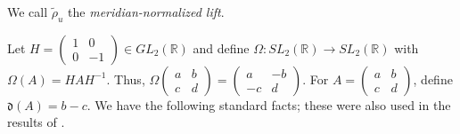\documentclass{article}
\theoremstyle{plain}
\theoremstyle{definition}
\theoremstyle{plain}
\theoremstyle{plain}
\theoremstyle{plain}
\theoremstyle{remark}
\theoremstyle{remark}
\theoremstyle{plain}
\theoremstyle{plain}
\theoremstyle{plain}
\theoremstyle{plain}
\begin{document}
We call $\widetilde\rho_u$ the \emph{meridian-normalized lift}. 

\medskip

Let $H = \left(\begin{smallmatrix}1 & 0 \\ 0 & -1\end{smallmatrix}\right) \in GL_2(\mathbb{R})$ and define $\Omega: SL_2(\mathbb{R}) \to SL_2(\mathbb{R})$ with $\Omega(A) = HAH^{-1}$. Thus, $\Omega\left(\begin{smallmatrix}a & b \\ c & d\end{smallmatrix}\right) = \left(\begin{smallmatrix}a & -b \\ -c & d\end{smallmatrix}\right)$. For $A = \left(\begin{smallmatrix}a & b \\ c & d\end{smallmatrix}\right)$, define  $\mathfrak{d}(A) = b - c$.  We have the following standard facts; these were also used in the results of \cite{WangDetectedSeifertSurfaces}.
\end{document}

